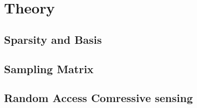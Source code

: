 \documentclass[Main]{subfiles}
\begin{document}
\section{Theory} %
\label{sec:theory}

	\subsection{Sparsity and Basis} %
	\label{sub:sparsity_and_basis}
	


	\subsection{Sampling Matrix} %
	\label{sub:sampling_matrix}



	\subsection{Random Access Comressive sensing} %
	\label{sub:random_access_comressive_sensing}
	




\end{document}
